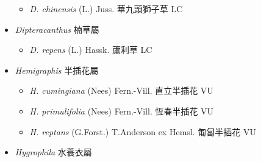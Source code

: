 \begin{itemize}
  \begin{itemize}
        \item[] \textit{D. chinensis} (L.) Juss.  華九頭獅子草   LC
  \end{itemize}
 \item[] \textit{Dipteracanthus} 楠草屬
                                
  \begin{itemize}
        \item[] \textit{D. repens} (L.) Hassk.  蘆利草   LC
  \end{itemize}
 \item[] \textit{Hemigraphis} 半插花屬
                                
  \begin{itemize}
        \item[] \textit{H. cumingiana} (Nees) Fern.-Vill.  直立半插花   VU
        \item[] \textit{H. primulifolia} (Nees) Fern.-Vill.  恆春半插花   VU
        \item[] \textit{H. reptans} (G.Forst.) T.Anderson ex Hemsl.  匍匐半插花   VU
  \end{itemize}
 \item[] \textit{Hygrophila} 水蓑衣屬
                                

\end{itemize}
